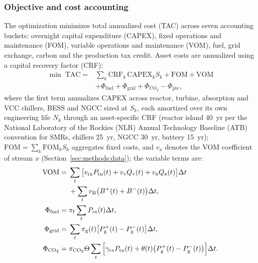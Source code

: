 \documentclass[a4paper,fleqn]{cas-sc}
\begin{document}
\subsubsection{Objective and cost accounting}
The optimization minimizes total annualized cost (TAC) across seven accounting buckets: overnight capital expenditure (CAPEX), fixed operations and maintenance (FOM), variable operations and maintenance (VOM), fuel, grid exchange, carbon and the production tax credit. Asset costs are annualized using a capital recovery factor (CRF):
\begin{equation}
\label{eq:tac}
\begin{aligned}
\min\; \mathrm{TAC} ={}&
\sum_k \mathrm{CRF}_k\,\mathrm{CAPEX}_k S_k + \mathrm{FOM} + \mathrm{VOM}\\
& + \Phi_\mathrm{fuel} + \Phi_\mathrm{grid} + \Phi_\mathrm{CO_2} - \Phi_\mathrm{ptc},
\end{aligned}
\end{equation}
where the first term annualizes CAPEX across reactor, turbine, absorption and VCC chillers, BESS and NGCC sized at $S_k$, each amortized over its own engineering life $N_k$ through an asset-specific CRF (reactor island 40~yr per the National Laboratory of the Rockies (NLR) Annual Technology Baseline (ATB) convention for SMRs, chillers 25~yr, NGCC 30~yr, battery 15~yr); $\mathrm{FOM}=\sum_k \mathrm{FOM}_k S_k$ aggregates fixed costs, and $v_x$ denotes the VOM coefficient of stream $x$ (Section~\ref{sec:methods:data}); the variable terms are:
\begin{align}
\mathrm{VOM} ={}&
  \sum_t \big[v_\mathrm{rx} P_\mathrm{tn}(t) + v_\mathrm{v} Q_\mathrm{v}(t) + v_\mathrm{a} Q_\mathrm{a}(t)\big]\Delta t
  \notag\\
& + \sum_t v_\mathrm{B}\big(B^{+}(t)+B^{-}(t)\big)\Delta t, \label{eq:vom}\\
\Phi_\mathrm{fuel} ={}& \pi_\mathrm{f} \sum_t P_\mathrm{rx}(t)\Delta t, \label{eq:fuel_cost}\\
\Phi_\mathrm{grid} ={}&
  \sum_t \pi_\mathrm{g}(t)\big[P_\mathrm{g}^{+}(t) - P_\mathrm{g}^{-}(t)\big]\Delta t, \label{eq:grid_cost}\\
\Phi_\mathrm{CO_2} ={}&
  \pi_\mathrm{CO_2}\Theta \sum_t
  \Big[\gamma_\mathrm{rx} P_\mathrm{tn}(t) + \theta(t)\big(P_\mathrm{g}^{+}(t)-P_\mathrm{g}^{-}(t)\big)\Big]\Delta t. \label{eq:carbon_cost}
\end{align}
\end{document}
